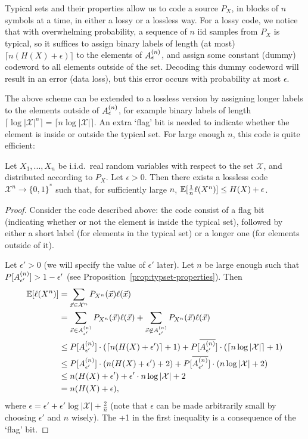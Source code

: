 Typical sets and their properties allow us to code a source $P_X$, in blocks of $n$ symbols at a time, in either a lossy or a lossless way. For a lossy code, we notice that with overwhelming probability, a sequence of $n$ iid samples from $P_X$ is typical, so it suffices to assign binary labels of length (at most) $\lceil n (H(X) + \epsilon)\rceil$ to the elements of $A_{\epsilon}^{(n)}$, and assign some constant (dummy) codeword to all elements outside of the set. Decoding this dummy codeword will result in an error (data loss), but this error occurs with probability at most $\epsilon$.

The above scheme can be extended to a lossless version by assigning longer labels to the elements outside of $A_{\epsilon}^{(n)}$, for example binary labels of length $\lceil \log |\mathcal{X}|^n\rceil = \lceil n \log |\mathcal{X}|\rceil$. An extra `flag' bit is needed to indicate whether the element is inside or outside the typical set. For large enough $n$, this code is quite efficient:
\begin{theorem}
Let $X_1, ..., X_n$ be i.i.d.\ real random variables with respect to the set $\mathcal{X}$, and distributed according to $P_X$. Let $\epsilon > 0$. Then there exists a lossless code $\mathcal{X}^n \to \{0,1\}^*$ such that, for sufficiently large $n$, $\mathbb{E}[\frac{1}{n} \ell(X^n)] \leq H(X) + \epsilon$.
\end{theorem}
\begin{proof}
Consider the code described above: the code consist of a flag bit (indicating whether or not the element is inside the typical set), followed by either a short label (for elements in the typical set) or a longer one (for elements outside of it).

Let $\epsilon' > 0$ (we will specify the value of $\epsilon'$ later). Let $n$ be large enough such that $P[A_{\epsilon'}^{(n)}] > 1 - \epsilon'$ (see Proposition~\ref{prop:typset-properties}). Then
\begin{align}
\mathbb{E}[\ell(X^n)] &= \sum_{\vec{x} \in \mathcal{X}^n} P_{X^n}(\vec{x}) \ell(\vec{x})\nonumber\\
&= \sum_{\vec{x} \in A_{\epsilon'}^{(n)}} P_{X^n}(\vec{x}) \ell(\vec{x}) + \sum_{\vec{x} \not\in A_{\epsilon'}^{(n)}} P_{X^n}(\vec{x}) \ell(\vec{x})\nonumber\\
&\leq P[A_{\epsilon'}^{(n)}] \cdot (\lceil n (H(X) + \epsilon') \rceil + 1) + P[\overline{A_{\epsilon'}^{(n)}}] \cdot (\lceil n \log |\mathcal{X}| \rceil + 1)\nonumber\\
&\leq P[A_{\epsilon'}^{(n)}] \cdot (n (H(X) + \epsilon') + 2) + P[\overline{A_{\epsilon'}^{(n)}}] \cdot (n \log |\mathcal{X}| + 2)\nonumber\\
&\leq n ( H(X) + \epsilon') + \epsilon' \cdot n \log |\mathcal{X}| + 2\nonumber\\
&= n(H(X) + \epsilon),
\end{align}
where $\epsilon = \epsilon' + \epsilon' \log |\mathcal{X}| + \frac{2}{n}$ (note that $\epsilon$ can be made arbitrarily small by choosing $\epsilon'$ and $n$ wisely). The +1 in the first inequality is a consequence of the `flag' bit.
\end{proof}
